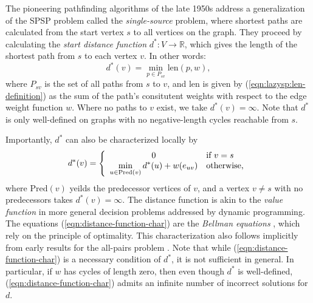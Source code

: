 The pioneering pathfinding algorithms of the late 1950s address
a generalization of the SPSP problem called
the \emph{single-source} problem,
where shortest paths are calculated from the start vertex $s$
to all vertices on the graph.
They proceed by calculating the \emph{start distance function}
$d^* : V \rightarrow \mathbb{R}$,
which gives the length of the shortest path from $s$
to each vertex $v$.
In other words:
\begin{equation}
   d^*(v) = \min_{p \in P_{sv}} \mbox{len}(p,w),
   \label{eqn:ibid-distance-function-global}
\end{equation}
where $P_{sv}$ is the set of all paths from $s$ to $v$,
and $\mbox{len}$ is given by (\ref{eqn:lazysp:len-definition})
as the sum of the path's consitutent weights
with respect to the edge weight function $w$.
Where no paths to $v$ exist,
we take $d^*(v) = \infty$.
Note that $d^*$ is only well-defined on graphs with no negative-length
cycles reachable from $s$.

Importantly, $d^*$ can also be characterized locally by
\begin{equation}
   d^*(v) = 
   \left\{ \begin{array}{cl}
      0 & \mbox{if } v = s \\
      \displaystyle\min_{u \in \mbox{\scriptsize Pred}(v)} d^*(u) + w(e_{uv}) & \mbox{otherwise,} \\
   \end{array} \right.
   \label{eqn:distance-function-char}
\end{equation}
where $\mbox{Pred}(v)$ yeilds the predecessor vertices of $v$,
and a vertex $v \neq s$ with no predecessors takes $d^*(v) = \infty$.
The distance function is akin to the \emph{value function}
in more general decision problems addressed by dynamic programming.
The equations (\ref{eqn:distance-function-char})
are the \emph{Bellman equations} \citep{bellman1958routing},
which rely on the principle of optimality.
This characterization also follows implicitly from early results for
the all-pairs problem
\citep{shimbel1955communicationnets, beckmann1955transportation}.
Note that while (\ref{eqn:distance-function-char})
is a necessary condition of $d^*$,
it is not sufficient in general.
In particular,
if $w$ has cycles of length zero,
then even though $d^*$ is well-defined,
(\ref{eqn:distance-function-char}) admits an infinite number
of incorrect solutions for $d$.

